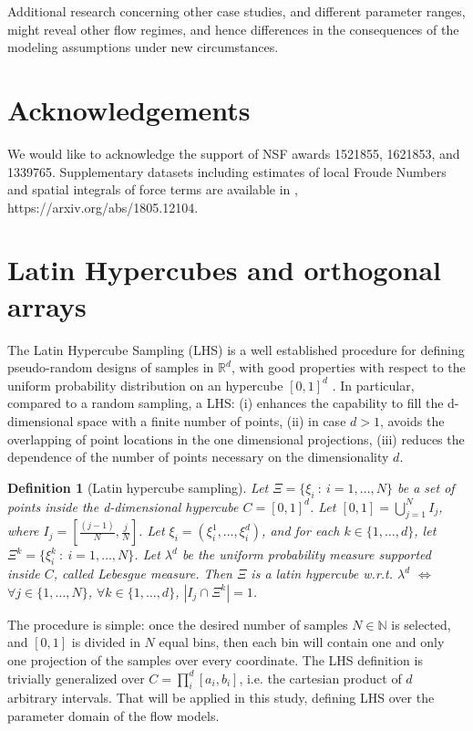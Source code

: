 \documentclass{article}
\newtheorem{definition}[theorem]{Definition}
\begin{document}
Additional research concerning other case studies, and different parameter ranges, might reveal other flow regimes, and hence differences in the consequences of the modeling assumptions under new circumstances.

\section*{Acknowledgements}
We would like to acknowledge the support of NSF awards 1521855, 1621853, and 1339765. Supplementary datasets including estimates of local Froude Numbers and spatial integrals of force terms are available in \cite{Patra2018}, https://arxiv.org/abs/1805.12104.

\appendix
\section{Latin Hypercubes and orthogonal arrays}\label{A-1}
The Latin Hypercube Sampling (LHS) is a well established procedure for defining pseudo-random designs of samples in $\mathbb R^d$, with good properties with respect to the uniform probability distribution on an hypercube $[0,1]^d$ \citep{McKay1979,Owen1992b,Stein1987,Ranjan2014,Mingyao2016}. In particular, compared to a random sampling, a LHS: (i) enhances the capability to fill the d-dimensional space with a finite number of points, (ii) in case $d>1$, avoids the overlapping of point locations in the one dimensional projections, (iii) reduces the dependence of the number of points necessary on the dimensionality $d$.

\begin{definition}[Latin hypercube sampling]
Let $\Xi=\{\xi_i\ :\ i=1,\dots,N\}$ be a set of points inside the d-dimensional hypercube $C=[0,1]^d$. Let $[0,1]=\bigcup_{j=1}^{N} I_j$, where $I_j=[\frac{(j-1)}{N},\frac{j}{N}]$. Let $\xi_i=\left(\xi_i^1,\dots,\xi_i^d\right)$, and for each $k\in\{1,\dots,d\}$, let $\Xi^k=\{\xi^k_i\ :\ i=1,\dots,N\}$. Let $\lambda^d$ be the uniform probability measure supported inside $C$, called Lebesgue measure. Then $\Xi$ is a latin hypercube w.r.t. $\lambda^d$ $\Longleftrightarrow$ $\forall j\in \{1,\dots,N\}$, $\forall k\in\{1,\dots,d\}$, $\left|I_j\cap\Xi^k\right|=1$.
\end{definition}

The procedure is simple: once the desired number of samples $N\in\mathbb N$ is selected, and $[0,1]$ is divided in $N$ equal bins, then each bin will contain one and only one projection of the samples over every coordinate. The LHS definition is trivially generalized over $C=\prod^d_i [a_i, b_i]$, i.e. the cartesian product of $d$ arbitrary intervals. That will be applied in this study, defining LHS over the parameter domain of the flow models.
\end{document}
